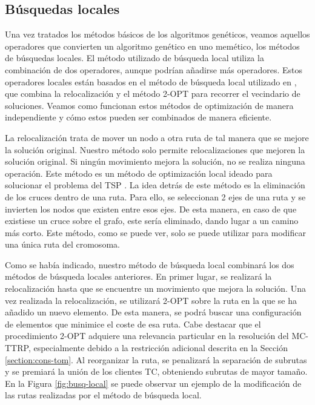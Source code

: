 \subsection{Búsquedas locales}
Una vez tratados los métodos básicos de los algoritmos genéticos, veamos aquellos operadores que convierten un algoritmo genético en uno memético, los métodos de búsquedas locales. El método utilizado de búsqueda local utiliza la combinación de dos operadores, aunque podrían añadirse más operadores. Estos operadores locales están basados en el método de búsqueda local utilizado en \cite{MC-VRP-Stochastic-Mendoza}, que combina la relocalización y el método 2-OPT para recorrer el vecindario de soluciones. Veamos como funcionan estos métodos de optimización de manera independiente y cómo estos pueden ser combinados de manera eficiente.
\begin{itemize}
    La relocalización trata de mover un nodo a otra ruta de tal manera que se mejore la solución original. Nuestro método solo permite relocalizaciones que mejoren la solución original. Si ningún movimiento mejora la solución, no se realiza ninguna operación.
     Este método es un método de optimización local ideado para solucionar el problema del TSP \cite{croes-1958}. La idea detrás de este método es la eliminación de los cruces dentro de una ruta. Para ello, se seleccionan 2 ejes de una ruta y se invierten los nodos que existen entre esos ejes. De esta manera, en caso de que existiese un cruce sobre el grafo, este sería eliminado, dando lugar a un camino más corto. Este método, como se puede ver, solo se puede utilizar para modificar una única ruta del cromosoma. 
\end{itemize}
Como se había indicado, nuestro método de búsqueda local combinará los dos métodos de búsqueda locales anteriores. En primer lugar, se realizará la relocalización hasta que se encuentre un movimiento que mejora la solución. Una vez realizada la relocalización, se utilizará 2-OPT sobre la ruta en la que se ha añadido un nuevo elemento. De esta manera, se podrá buscar una configuración de elementos que minimice el coste de esa ruta. Cabe destacar que el procedimiento 2-OPT adquiere una relevancia particular en la resolución del MC-TTRP, especialmente debido a la restricción adicional descrita en la Sección \ref{section:cons-tom}. Al reorganizar la ruta, se penalizará la separación de subrutas y se premiará la unión de los clientes TC, obteniendo subrutas de mayor tamaño. En la Figura \ref{fig:busq-local} se puede observar un ejemplo de la modificación de las rutas realizadas por el método de búsqueda local.
